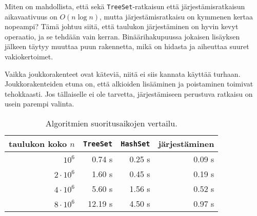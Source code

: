Miten on mahdollista, että sekä \texttt{TreeSet}-ratkaisun että
järjestämisrat\-kaisun aikavaativuus on $O(n \log n)$, mutta
järjestämisratkaisu on kymmenen kertaa nopeampi?
Tämä johtuu siitä, että taulukon järjestäminen on hyvin kevyt
operaatio, ja se tehdään vain kerran.
Binäärihakupuussa jokaisen lisäyksen jälkeen täytyy muuttaa
puun rakennetta, mikä on hidasta ja aiheuttaa suuret vakiokertoimet.

Vaikka joukkorakenteet ovat käteviä, niitä ei siis kannata
käyttää turhaan.
Joukkorakenteiden etuna on, että alkioiden lisääminen ja poistaminen
toimivat tehokkaasti.
Jos tällaiselle ei ole tarvetta, järjestämiseen perustuva ratkaisu
on usein parempi valinta.

\begin{table}
\center
\begin{tabular}{rrrr}
taulukon koko $n$ & \texttt{TreeSet} & \texttt{HashSet} & järjestäminen \\
\hline
$10^6$ & 0.74 s & 0.25 s & 0.09 s \\
$2 \cdot 10^6$ & 1.60 s & 0.45 s & 0.19 s \\
$4 \cdot 10^6$ & 5.60 s & 1.56 s & 0.52 s \\
$8 \cdot 10^6$ & 12.19 s & 4.50 s & 0.97 s \\
\end{tabular}
\caption{Algoritmien suoritusaikojen vertailu.}
\label{tab:eriver}
\end{table}
